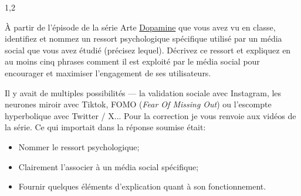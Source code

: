 \documentclass[11pt,a4paper]{exam}
\begin{document}
\begin{spacing}{1,2}
\begin{questions}
        	À partir de l’épisode de la série Arte \uline{Dopamine} que vous avez vu en classe, identifiez et nommez un ressort psychologique spécifique utilisé par un média social que vous avez étudié (précisez lequel). Décrivez ce ressort et expliquez en au moins cinq phrases comment il est exploité par le média social pour encourager et maximiser l’engagement de ses utilisateurs.
        	\begin{solution}
        		Il y avait de multiples possibilités --- la validation sociale avec Instagram, les neurones miroir avec Tiktok, FOMO (\textit{Fear Of Missing Out}) ou l'escompte hyperbolique avec Twitter / X... Pour la correction je vous renvoie aux vidéos de la série. Ce qui importait dans la réponse soumise était:
        		\begin{itemize}
        			\item Nommer le ressort psychologique;
        			\item Clairement l'associer à un média social spécifique;
        			\item Fournir quelques éléments d'explication quant à son fonctionnement.
        		\end{itemize}
        	\end{solution}
        	
  
        \end{questions}
    \end{spacing}
\end{document}
